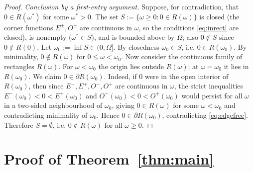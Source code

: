 \documentclass[12pt]{article}
\theoremstyle{definition}
\begin{document}
\begin{proof}
\emph{Conclusion by a first-entry argument.} Suppose, for contradiction, that
$0\in R(\omega^*)$ for some $\omega^*>0$. The set
$S:=\{\omega\ge0:0\in R(\omega)\}$ is closed (the corner functions $E^\pm,O^\pm$ are
continuous in $\omega$, so the conditions \eqref{eq:inrect} are closed), is nonempty
($\omega^*\in S$), and is bounded above by $\Omega$; also $0\notin S$ since $0\notin R(0)$.
Let $\omega_0:=\inf S\in(0,\Omega]$. By closedness $\omega_0\in S$, i.e. $0\in
R(\omega_0)$. By minimality, $0\notin R(\omega)$ for $0\le\omega<\omega_0$. Now consider
the continuous family of rectangles $R(\omega)$. For $\omega<\omega_0$ the origin lies
outside $R(\omega)$; at $\omega=\omega_0$ it lies in $R(\omega_0)$. We claim
$0\in\partial R(\omega_0)$. Indeed, if $0$ were in the open interior of $R(\omega_0)$, then
since $E^-,E^+,O^-,O^+$ are continuous in $\omega$, the strict inequalities
$E^-(\omega_0)<0<E^+(\omega_0)$ and $O^-(\omega_0)<0<O^+(\omega_0)$ would persist for all
$\omega$ in a two-sided neighbourhood of $\omega_0$, giving $0\in R(\omega)$ for some
$\omega<\omega_0$ and contradicting minimality of $\omega_0$. Hence
$0\in\partial R(\omega_0)$, contradicting \eqref{eq:edgefree}. Therefore $S=\emptyset$,
i.e. $0\notin R(\omega)$ for all $\omega\ge0$.
\end{proof}

\section{Proof of Theorem~\ref{thm:main}}
\end{document}
